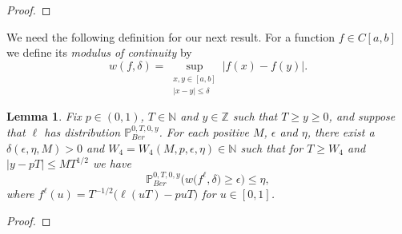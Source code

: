 \documentclass[12pt]{article}
\newtheorem{lemma}{Lemma}
\begin{document}
	\begin{proof}
		
	\end{proof}

	We need the following definition for our next result. For a function $f \in C[a,b]$ we define its {\em modulus of continuity} by
	\begin{equation}\label{MOCS4}
	w(f,\delta) = \sup_{\substack{x,y \in [a,b]\\ |x-y| \leq \delta}} |f(x) - f(y)|.
	\end{equation}
	\begin{lemma}\label{MOCLemmaS4}Fix $p \in (0,1)$, $T \in \mathbb{N}$ and $y\in \mathbb{Z}$ such that $T \geq y \geq 0$, and suppose that $\ell$ has distribution $\mathbb{P}^{0,T,0,y}_{Ber}$. For each positive $M$, $\epsilon$ and $\eta$, there exist a $\delta(\epsilon, \eta, M) > 0$ and $W_4 = W_4(M, p, \epsilon, \eta) \in \mathbb{N}$ such that  for $T \geq W_4$ and $|y - pT| \leq MT^{1/2}$ we have
		\begin{equation}\label{MOCeqS4}
		\mathbb{P}^{0,T,0,y}_{Ber}\Big( w\big({f^\ell},\delta\big) \geq \epsilon \Big) \leq \eta,
		\end{equation}
		where $f^\ell(u) = T^{-1/2}\big(\ell(uT) - puT\big)$  for $u \in [0,1]$.
	\end{lemma}
	
	\begin{proof}
		
	\end{proof}
	
	
\end{document}
